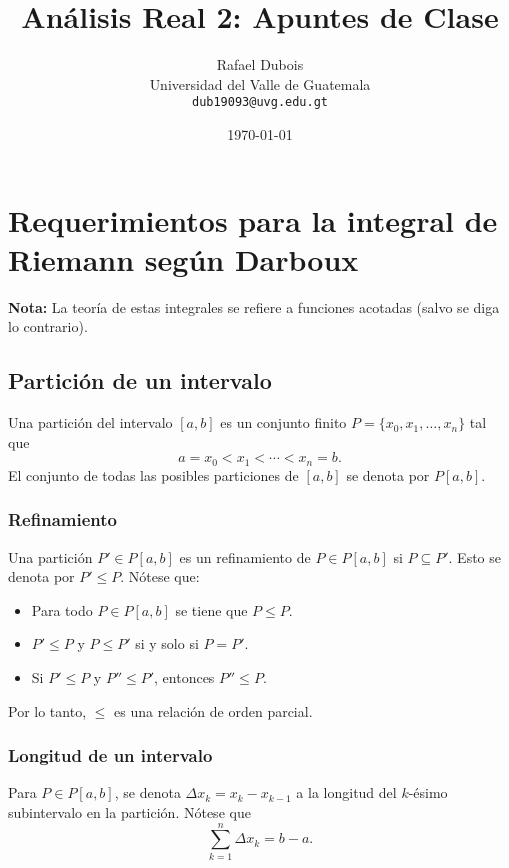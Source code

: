 \documentclass{article}
\title{Análisis Real 2: Apuntes de Clase}
\author{\Large Rafael Dubois\\ Universidad del Valle de Guatemala \\ \texttt{dub19093@uvg.edu.gt}}
\date{\today}
\begin{document}
\maketitle
{}
\thispagestyle{fancy}

\section*{Requerimientos para la integral de Riemann según Darboux}

\textbf{Nota:} La teoría de estas integrales se refiere a funciones acotadas (salvo se diga lo contrario).

\subsection*{Partición de un intervalo}

Una partición del intervalo $[a,b]$ es un conjunto finito $P=\{x_0,x_1,\ldots,x_n\}$ tal que 
$$a=x_0<x_1<\cdots<x_n=b.$$
El conjunto de todas las posibles particiones de $[a,b]$ se denota por $P[a,b]$.

\subsubsection*{Refinamiento}
Una partición $P'\in P[a,b]$ es un refinamiento de $P\in P[a,b]$ si $P\subseteq P'$. Esto se denota por $P'\leq P$. Nótese que:
\begin{itemize}
\item Para todo $P\in P[a,b]$ se tiene que $P\leq P$.
\item $P'\leq P$ y $P\leq P'$ si y solo si $P=P'$.
\item Si $P'\leq P$ y $P''\leq P'$, entonces $P''\leq P$.
\end{itemize}
Por lo tanto, $\leq$ es una relación de orden parcial.

\subsubsection*{Longitud de un intervalo}
Para $P\in P[a,b]$, se denota $\Delta x_k=x_k-x_{k-1}$ a la longitud del $k$-ésimo subintervalo en la partición. Nótese que
$$\sum_{k=1}^{n}\Delta x_k=b-a.$$
\end{document}

